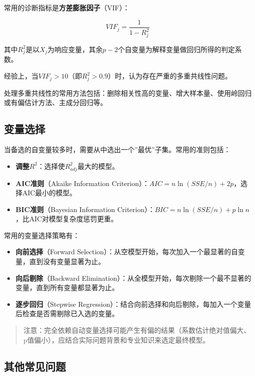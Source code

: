 \documentclass[
]{book}
\providecommand{\tightlist}{%
  \setlength{\itemsep}{0pt}\setlength{\parskip}{0pt}}
\begin{document}
常用的诊断指标是\textbf{方差膨胀因子}（VIF）：

\[
VIF_j = \frac{1}{1 - R_j^2}
\]

其中\(R_j^2\)是以\(X_j\)为响应变量，其余\(p-2\)个自变量为解释变量做回归所得的判定系数。

经验上，当\(VIF_j > 10\)（即\(R_j^2 > 0.9\)）时，认为存在严重的多重共线性问题。

处理多重共线性的常用方法包括：删除相关性高的变量、增大样本量、使用岭回归或有偏估计方法、主成分回归等。

\subsection{变量选择}\label{ux53d8ux91cfux9009ux62e9}

当备选的自变量较多时，需要从中选出一个''最优''子集。常用的准则包括：

\begin{itemize}
\tightlist
\item
  \textbf{调整\(R^2\)}：选择使\(R^2_{adj}\)最大的模型。
\item
  \textbf{AIC准则}（Akaike Information Criterion）：\(AIC = n \ln(SSE/n) + 2p\)，选择AIC最小的模型。
\item
  \textbf{BIC准则}（Bayesian Information Criterion）：\(BIC = n \ln(SSE/n) + p \ln n\)，比AIC对模型复杂度惩罚更重。
\end{itemize}

常用的变量选择策略有：

\begin{itemize}
\tightlist
\item
  \textbf{向前选择}（Forward Selection）：从空模型开始，每次加入一个最显著的自变量，直到没有变量显著为止。
\item
  \textbf{向后剔除}（Backward Elimination）：从全模型开始，每次剔除一个最不显著的变量，直到所有变量都显著为止。
\item
  \textbf{逐步回归}（Stepwise Regression）：结合向前选择和向后剔除，每加入一个变量后检查是否需剔除已入选的变量。
\end{itemize}

\begin{quote}
注意：完全依赖自动变量选择可能产生有偏的结果（系数估计绝对值偏大、p值偏小），应结合实际问题背景和专业知识来选定最终模型。
\end{quote}

\subsection{其他常见问题}\label{ux5176ux4ed6ux5e38ux89c1ux95eeux9898}
\end{document}
